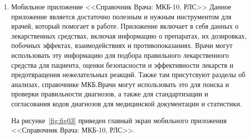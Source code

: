 \begin{enumerate}
    \item Мобильное приложение <<Справочник Врача: МКБ-10, РЛС>>
    Данное приложение является достаточно полезным и нужным инструментом для врачей, который помогает в работе. Приложение включает в себя данных о лекарственных средствах, включая информацию о препаратах, их дозировках, побочных эффектах, взаимодействиях и противопоказаниях. Врачи могут использовать эту информацию для подбора правильного лекарственного средства для пациента, оценки безопасности и эффективности лекарств и предотвращения нежелательных реакций. Также там присутсвуют разделы об анализах, справочнике МКБ.Врачи могут использовать это для поиска и проверки правильности диагнозов, а также для стандартизации и согласования кодов диагнозов для медицинской документации и статистики.

    На рисунке~\ref{fig:fig03} приведен главный экран мобильного приложения <<Справочник Врача: МКБ-10, РЛС>>.
    

\end{enumerate}
